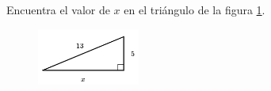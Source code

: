 \question[15]  Encuentra el valor de $x$ en el triángulo de la figura \ref{fig:lados_pitagoras_23}.
\begin{figure}[H]
    \begin{center}
        \includegraphics[width=0.3\textwidth]{../images/lados_pitagoras_23.png}
    \end{center}
    \caption{}
    \label{fig:lados_pitagoras_23}
\end{figure}